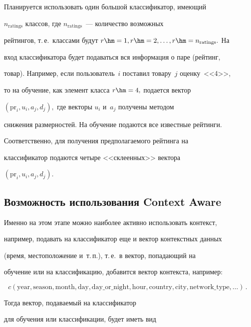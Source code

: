 Планируется использовать один большой классификатор, имеющий


$n_{\mathrm{ratings}}$ классов, где $n_{\mathrm{ratings}}$~--- количество возможных


рейтингов, т.\,е.\ классами будут $r\hm=1,r\hm=2,\ldots,r\hm=n_{\mathrm{ratings}}.$ На


вход классификатора будет подаваться вся информация о паре (рейтинг,


товар). Например, если пользователь~$i$ поставил товару~$j$ оценку~<<4>>, 


то на обучение, как элемент класса $r\hm=4,$ подается вектор


$(\mathrm{pr}_i,u_i,a_j,d_j),$ где векторы $u_i$ и~$a_j$ получены методом


снижения размерностей. На обучение подаются все известные рейтинги.





Соответственно, для получения предполагаемого рейтинга на


классификатор подаются четыре <<склеенных>> вектора


$(\mathrm{pr}_i,u_i,a_j,d_j).$





\subsection{Возможность использования Context Aware}





Именно на этом этапе можно наиболее активно использовать контекст,


например, подавать на классификатор еще и вектор контекстных данных


(время, местоположение и~т.\,п.), т.\,е.\ в вектор, попадающий на


обучение или на классификацию, добавится вектор контекста, например:


$$


c(\mathrm{year, season, month, day, day}\_\mathrm{or}\_\mathrm{night, hour, country, city,


network}\_\mathrm{type}, \ldots)\,.


$$ 


Тогда вектор, подаваемый на классификатор


для обучения или классификации, будет иметь вид


